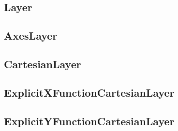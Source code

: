 \documentclass[../../../../main.tex]{subfiles}
\begin{document}
\subsection{Layer}

\subsection{AxesLayer}

\subsection{CartesianLayer}

\subsection{ExplicitXFunctionCartesianLayer}

\subsection{ExplicitYFunctionCartesianLayer}
\newpage
\end{document}
